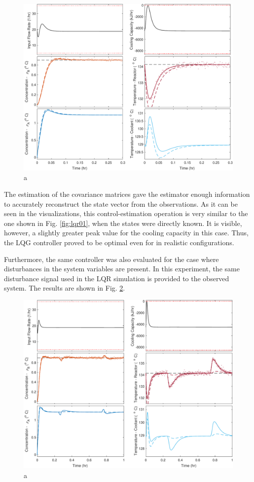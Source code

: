 \documentclass[a4paper,11pt]{book}
\numberwithin{figure}{chapter}
\numberwithin{equation}{chapter}
\numberwithin{table}{chapter}
\theoremstyle{definition}
\begin{document}
\begin{figure}[ht] \centering
	\includegraphics[width=\textwidth]{chapter7/lqg01}
	\caption{a}
	\label{fig:lqg01}
\end{figure}

The estimation of the covariance matrices gave the estimator enough information to accurately reconstruct the state vector from the observations. As it can be seen in the visualizations, this control-estimation operation is very similar to the one shown in Fig. \ref{fig:lqr01}, when the states were directly known. It is visible, however, a slightly greater peak value for the cooling capacity in this case. Thus, the LQG controller proved to be optimal even for in realistic configurations.

Furthermore, the same controller was also evaluated for the case where disturbances in the system variables are present. In this experiment, the same disturbance signal used in the LQR simulation is provided to the observed system. The results are shown in Fig. \ref{fig:lqg02}.

\begin{figure}[ht] \centering
	\includegraphics[width=\textwidth]{chapter7/lqg02}
	\caption{a}
	\label{fig:lqg02}
\end{figure}	
\end{document}
